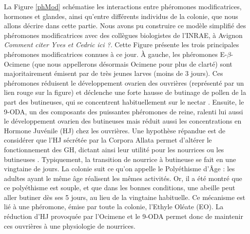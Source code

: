 			La Figure \ref{phMod} schématise les interactions entre phéromones modificatrices, hormones et glandes, ainsi qu'entre différents individus de la colonie, que nous allons décrire dans cette partie. Nous avons pu construire ce modèle simplifié des phéromones modificatrices avec des collègues biologistes de l'INRAE, à Avignon \textit{Comment citer Yves et Cedric ici ?}. Cette Figure présente les trois principales phéromones modificatrices connues à ce jour. À gauche, les phéromones E-$\beta$-Ocimene (que nous appellerons désormais Ocimene pour plus de clarté) sont majoritairement émisent par de très jeunes larves (moins de 3 jours). Ces phéromones réduisent le développement ovarien des ouvrières (représenté par un lien rouge sur la figure) et déclenche une forte hausse de butinage de pollen de la part des butineuses, qui se concentrent habituellement sur le nectar \cite{maisonnasse_e-b-ocimene_2010}. Ensuite, le 9-ODA, un des composants des puissantes phéromones de reine, ralenti lui aussi le développement ovarien des butineuses mais réduit aussi les concentrations en Hormone Juvénile (HJ) chez les ouvrières. Une hypothèse répandue est de considérer que l'HJ sécrétée par la Corpora Allata permet d'altérer le fonctionnement des GH, dictant ainsi leur utilité pour les nourrices ou les butineuses \cite{robinson_colony_1998}. Typiquement, la transition de nourrice à butineuse se fait en une vingtaine de jours. La colonie suit ce qu'on appelle le Polyéthisme d'Âge : les adultes ayant le même âge réalisent les mêmes activités. Or, il a été montré que ce polyéthisme est souple, et que dans les bonnes conditions, une abeille peut aller butiner dès ses 5 jours, au lieu de la vingtaine habituelle. Ce mécanisme est lié à une phéromone, émise par toute la colonie, l'Ethyle Oléate (EO). La réduction d'HJ provoquée par l'Ocimene et le 9-ODA permet donc de maintenir ces ouvrières à une physiologie de nourrices.
			
